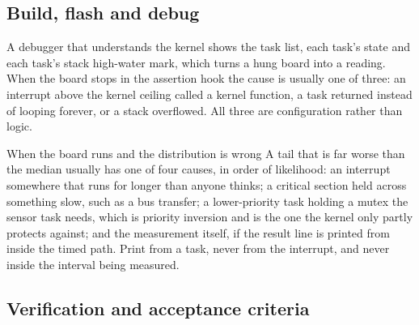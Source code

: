 \subsection*{Build, flash and debug}



A debugger that understands the kernel shows the task list, each task's state
and each task's stack high-water mark, which turns a hung board into a reading.
When the board stops in the assertion hook the cause is usually one of three:
an interrupt above the kernel ceiling called a kernel function, a task returned
instead of looping forever, or a stack overflowed. All three are configuration
rather than logic.

\begin{note}{When the board runs and the distribution is wrong}
A tail that is far worse than the median usually has one of four causes, in
order of likelihood: an interrupt somewhere that runs for longer than anyone
thinks; a critical section held across something slow, such as a bus transfer;
a lower-priority task holding a mutex the sensor task needs, which is priority
inversion and is the one the kernel only partly protects against; and the
measurement itself, if the result line is printed from inside the timed path.
Print from a task, never from the interrupt, and never inside the interval
being measured.
\end{note}

\subsection*{Verification and acceptance criteria}

